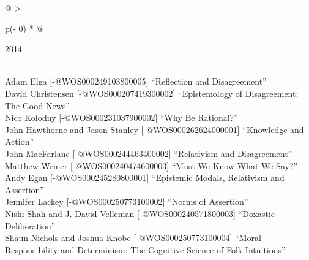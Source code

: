 \documentclass[
  10pt,
  letterpaper,
  DIV=11,
  numbers=noendperiod,
  twoside]{scrartcl}
\begin{document}
\begin{longtable}[]{@{}
  >{\raggedright\arraybackslash}p{(\columnwidth - 0\tabcolsep) * }@{}}

\caption{\label{tbl-top-ten-2005}Most cited articles published less than
ten years ago as of 2014.}

\tabularnewline

\toprule\noalign{}
\begin{minipage}[b]{\linewidth}\raggedright
2014
\end{minipage} \\
\midrule\noalign{}
\endhead
\bottomrule\noalign{}
\endlastfoot
Adam Elga {[}-@WOS000249103800005{]} ``Reflection and Disagreement'' \\
David Christensen {[}-@WOS000207419300002{]} ``Epistemology of
Disagreement: The Good News'' \\
Nico Kolodny {[}-@WOS000231037900002{]} ``Why Be Rational?'' \\
John Hawthorne and Jason Stanley {[}-@WOS000262624000001{]} ``Knowledge
and Action'' \\
John MacFarlane {[}-@WOS000244463400002{]} ``Relativism and
Disagreement'' \\
Matthew Weiner {[}-@WOS000240474600003{]} ``Must We Know What We
Say?'' \\
Andy Egan {[}-@WOS000245280800001{]} ``Epistemic Modals, Relativism and
Assertion'' \\
Jennifer Lackey {[}-@WOS000250773100002{]} ``Norms of Assertion'' \\
Nishi Shah and J. David Velleman {[}-@WOS000240571800003{]} ``Doxastic
Deliberation'' \\
Shaun Nichols and Joshua Knobe {[}-@WOS000250773100004{]} ``Moral
Responsibility and Determinism: The Cognitive Science of Folk
Intuitions'' \\

\end{longtable}
\end{document}
